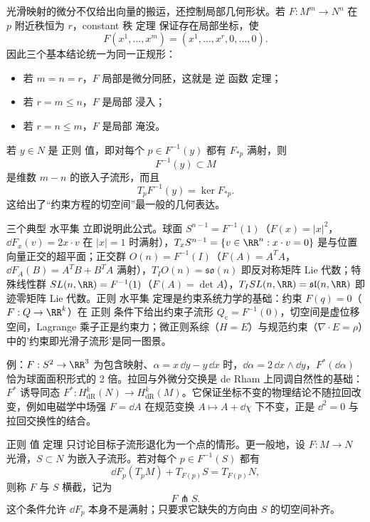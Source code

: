 光滑映射的微分不仅给出向量的搬运，还控制局部几何形状。若 $F:M^m\to N^n$ 在 $p$ 附近秩恒为 $r$，constant 秩 定理 保证存在局部坐标，使
\[
F(x^1,\ldots,x^m)
=(x^1,\ldots,x^r,0,\ldots,0).
\]
因此三个基本结论统一为同一正规形：
\begin{itemize}
\item 若 $m=n=r$，$F$ 局部是微分同胚，这就是 逆 函数 定理；
\item 若 $r=m\le n$，$F$ 是局部 浸入；
\item 若 $r=n\le m$，$F$ 是局部 淹没。
\end{itemize}
若 $y\in N$ 是 正则 值，即对每个 $p\in F^{-1}(y)$ 都有 $F_{*p}$ 满射，则
\begin{equation*}F^{-1}(y)\subset M\end{equation*}
是维数 $m-n$ 的嵌入子流形，而且
\begin{equation}
T_pF^{-1}(y)=\ker F_{*p}.
\label{eq:tangent-regular-level-set}
\end{equation}
这给出了“约束方程的切空间”最一般的几何表达。

三个典型 水平集 立即说明此公式。球面 $S^{n-1}=F^{-1}(1)$（$F(x)=|x|^2$，$\dd F_x(v)=2x\cdot v$ 在 $|x|=1$ 时满射），$T_xS^{n-1}=\{v\in\RR^n:x\cdot v=0\}$ 是与位置向量正交的超平面；正交群 $O(n)=F^{-1}(I)$（$F(A)=A^TA$，$\dd F_A(B)=A^TB+B^TA$ 满射），$T_IO(n)=\mathfrak{so}(n)$ 即反对称矩阵 Lie 代数；特殊线性群 $SL(n,\RR)=F^{-1}(1)$（$F(A)=\det A$），$T_ISL(n,\RR)=\mathfrak{sl}(n,\RR)$ 即迹零矩阵 Lie 代数。正则 水平集 定理是约束系统力学的基础：约束 $F(q)=0$（$F:Q\to\RR^k$）在 正则 条件下给出约束子流形 $Q_{\mathrm c}=F^{-1}(0)$，切空间是虚位移空间，Lagrange 乘子正是约束力；微正则系综（$H=E$）与规范约束（$\nabla\cdot E=\rho$）中的'约束即光滑子流形'是同一图景。

例：$F:S^2\to\RR^3$ 为包含映射、$\alpha=x\,\dd y-y\,\dd x$ 时，$\dd\alpha=2\,\dd x\wedge\dd y$，$F^*(\dd\alpha)$ 恰为球面面积形式的 2 倍。拉回与外微分交换是 de Rham 上同调自然性的基础：$F^*$ 诱导同态 $F^*:H^k_{\mathrm{dR}}(N)\to H^k_{\mathrm{dR}}(M)$。它保证坐标不变的物理结论不随拉回改变，例如电磁学中场强 $F=\dd A$ 在规范变换 $A\mapsto A+\dd\chi$ 下不变，正是 $\dd^2=0$ 与拉回交换性的结合。

正则 值 定理 只讨论目标子流形退化为一个点的情形。更一般地，设 $F:M\to N$ 光滑，$S\subset N$ 为嵌入子流形。若对每个 $p\in F^{-1}(S)$ 都有
\begin{equation}
{
\dd F_p(T_pM)+T_{F(p)}S=T_{F(p)}N,
}
\label{eq:math-dg-transversality}
\end{equation}
则称 $F$ 与 $S$ 横截，记为
\[
F\pitchfork S.
\]
这个条件允许 $\dd F_p$ 本身不是满射；只要求它缺失的方向由 $S$ 的切空间补齐。

